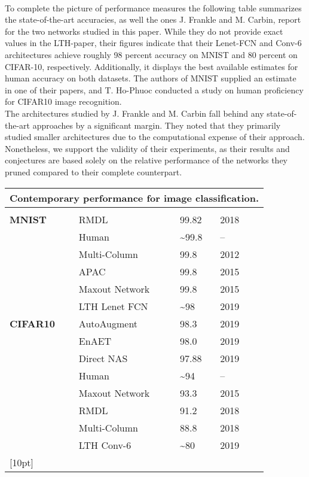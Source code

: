 \\ 
To complete the picture of performance measures the following table summarizes the state-of-the-art accuracies, as well the ones J. Frankle and M. Carbin, report for the two networks studied in this paper.   
While they do not provide exact values in the LTH-paper, their figures indicate that their Lenet-FCN and Conv-6 architectures achieve roughly 98 percent accuracy on MNIST and 80 percent on CIFAR-10, respectively. \cite{LTH} Additionally, it displays the best available estimates for human accuracy on both datasets. The authors of MNIST supplied an estimate in one of their papers, and T. Ho-Phuoc conducted a study on human proficiency for CIFAR10 image recognition.\cite{MNIST-Human}\cite{CIFAR10-Human}\\
The architectures studied by J. Frankle and M. Carbin fall behind any state-of-the-art approaches by a significant margin. They noted that they primarily studied smaller architectures due to the computational expense of their approach.\cite{LTH}
Nonetheless, we support the validity of their experiments, as their results and conjectures are based solely on the relative performance of the networks they pruned compared to their complete counterpart.\\
\begin{tabularx}{\textwidth}{X X X X X}
	\multicolumn{5}{c}{\textbf{Contemporary performance for image classification.}}\\
	\hline
	\endhead
	\\
	\textbf{MNIST} & RMDL & 99.82 & 2018 & \cite{RMDL}\\
	& Human & \textasciitilde99.8 & -- & \cite{MNIST-Human}\\
	& Multi-Column & 99.8 & 2012 & \cite{Multi-Column}\\
	& APAC & 99.8 & 2015 & \cite{APAC}\\
	& Maxout Network & 99.8 & 2015 & \cite{Batch-Normalized}\\
	& LTH Lenet FCN & \textasciitilde98 & 2019 & \cite{LTH}\\
	[14pt]
	\textbf{CIFAR10} & AutoAugment & 98.3 & 2019 & \cite{Auto-Augment}\\
	& EnAET & 98.0 & 2019 & \cite{EnAET}\\
	& Direct NAS & 97.88 & 2019 & \cite{Direct-NAS}\\
	& Human & \textasciitilde94 & -- & \cite{CIFAR10-Human}\\
	& Maxout Network & 93.3 & 2015 & \cite{Batch-Normalized}\\
	& RMDL & 91.2 & 2018 & \cite{RMDL}\\
	& Multi-Column & 88.8 & 2018 & \cite{Multi-Column}\\
	& LTH Conv-6 & \textasciitilde80 & 2019 & \cite{LTH}\\
	[10pt]
	\hline
\end{tabularx}


